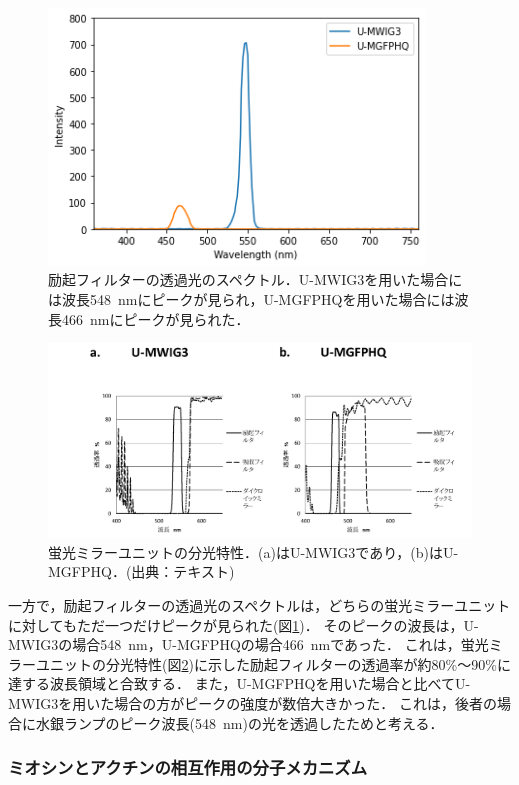 \documentclass[a4paper,11pt, titlepage]{jsarticle}
\begin{document}
\begin{figure}[htbp]
    \centering
    \includegraphics[width=10cm]{filters.png}
    \caption{励起フィルターの透過光のスペクトル．U-MWIG3を用いた場合には波長\SI{548}{\nm}にピークが見られ，U-MGFPHQを用いた場合には波長\SI{466}{\nm}にピークが見られた．}
    \label{fig:filter}
\end{figure}

\begin{figure}[htbp]
    \centering
    \includegraphics[width=14cm]{filters_text.png}
    \caption{蛍光ミラーユニットの分光特性．(a)はU-MWIG3であり，(b)はU-MGFPHQ．(出典：テキスト\cite{text})}
    \label{fig:filter_text}
\end{figure}

一方で，励起フィルターの透過光のスペクトルは，どちらの蛍光ミラーユニットに対してもただ一つだけピークが見られた(図\ref{fig:filter})．
そのピークの波長は，U-MWIG3の場合\SI{548}{\nm}，U-MGFPHQの場合\SI{466}{\nm}であった．
これは，蛍光ミラーユニットの分光特性(図\ref{fig:filter_text})に示した励起フィルターの透過率が約80\%～90\%に達する波長領域と合致する．
また，U-MGFPHQを用いた場合と比べてU-MWIG3を用いた場合の方がピークの強度が数倍大きかった．
これは，後者の場合に水銀ランプのピーク波長(\SI{548}{\nm})の光を透過したためと考える．

\subsubsection{ミオシンとアクチンの相互作用の分子メカニズム}
\end{document}
